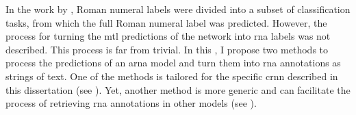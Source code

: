 
In the work by \textcite{chen2018functional}, Roman numeral
labels were divided into a subset of classification tasks,
from which the full Roman numeral label was predicted.
However, the process for turning the \gls{mtl} predictions
of the network into \gls{rna} labels was not described. This
process is far from trivial. In this \thesisdiss{}, I
propose two methods to process the predictions of an
\gls{arna} model and turn them into \gls{rna} annotations as
strings of text. One of the methods is tailored for the
specific \gls{crnn} described in this dissertation (see
). Yet, another method is more
generic and can facilitate the process of retrieving
\gls{rna} annotations in other models (see
).
